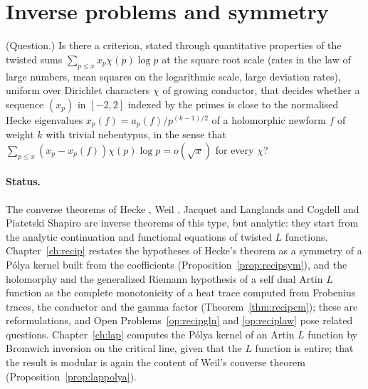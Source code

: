 \section{Inverse problems and symmetry}

\begin{problem}\label{op:inverse}
(Question.) Is there a criterion, stated through quantitative properties of the twisted sums $\sum_{p\le x}x_p\chi(p)\log p$ at the square root scale (rates in the law of large numbers, mean squares on the logarithmic scale, large deviation rates), uniform over Dirichlet characters $\chi$ of growing conductor, that decides whether a sequence $(x_p)$ in $[-2,2]$ indexed by the primes is close to the normalised Hecke eigenvalues $x_p(f)=a_p(f)/p^{(k-1)/2}$ of a holomorphic newform $f$ of weight $k$ with trivial nebentypus, in the sense that $\sum_{p\le x}(x_p-x_p(f))\chi(p)\log p=o(\sqrt x)$ for every $\chi$?
\end{problem}

\paragraph{Status.} The converse theorems of Hecke \cite{hecke1936}, Weil \cite{weil1967}, Jacquet and Langlands \cite{jacquetlanglands1970} and Cogdell and Piatetski Shapiro \cite{cogdellps1994} are inverse theorems of this type, but analytic: they start from the analytic continuation and functional equations of twisted $L$ functions. Chapter~\ref{ch:recip} restates the hypotheses of Hecke's theorem as a symmetry of a P\'olya kernel built from the coefficients (Proposition~\ref{prop:recipsym}), and the holomorphy and the generalized Riemann hypothesis of a self dual Artin $L$ function as the complete monotonicity of a heat trace computed from Frobenius traces, the conductor and the gamma factor (Theorem~\ref{thm:recipcm}); these are reformulations, and Open Problems~\ref{op:recipgln} and \ref{op:reciplaw} pose related questions. Chapter~\ref{ch:lap} computes the P\'olya kernel of an Artin $L$ function by Bromwich inversion on the critical line, given that the $L$ function is entire; that the result is modular is again the content of Weil's converse theorem (Proposition~\ref{prop:lappolya}).

